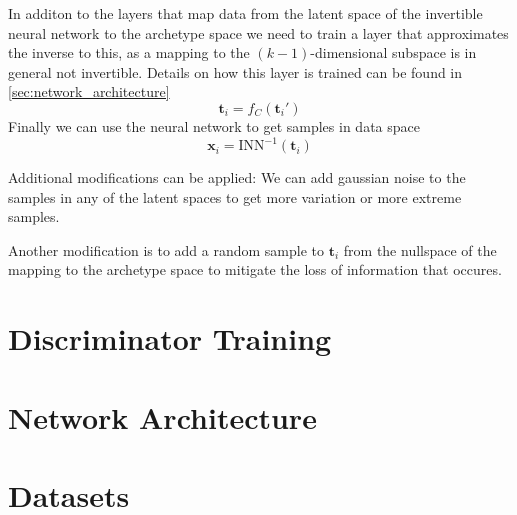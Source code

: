 In additon to the layers that map data from the latent space of the invertible
neural network to the archetype space we need to train a layer that
approximates the inverse to this, as a mapping to the $(k-1)$-dimensional
subspace is in general not invertible. Details on how this layer is trained can
be found in \autoref{sec:network_architecture}
\begin{equation}%
    \label{eq:aa_upsample}
    \mathbf{t}_i = f_C (\mathbf{t}_i')
\end{equation}
Finally we can use the neural network to get samples in data space
\begin{equation}%
    \label{eq:aa_to_data}
    \mathbf{x}_i = \mathrm{INN}^{-1} (\mathbf{t}_i)
\end{equation}

Additional modifications can be applied: We can add gaussian noise to the
samples in any of the latent spaces to get more variation or more extreme
samples.

Another modification is to add a random sample to $\mathbf{t}_i$ from the
nullspace of the mapping to the archetype space to mitigate the loss of
information that occures.

\section{Discriminator Training}%
\label{sec:discriminator_training}


\section{Network Architecture}%
\label{sec:network_architecture}


\section{Datasets}%
\label{sec:datasets}


